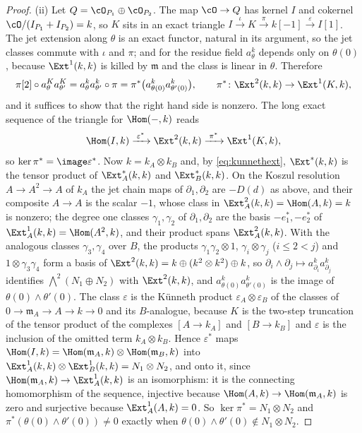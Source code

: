 \begin{proof}
(ii) Let $Q=\cO_{P_{1}}\oplus\cO_{P_{2}}$. The map $\cO\to Q$ has kernel $I$
and cokernel $\cO/(I_{P_{1}}+I_{P_{2}})=k$, so $K$ sits in an exact triangle
$I\xrightarrow{\iota}K\xrightarrow{\pi}k[-1]\xrightarrow{\varepsilon}I[1]$.
The jet extension along $\theta$ is an exact functor, natural in its
argument, so the jet classes commute with $\iota$ and $\pi$; and for the
residue field $a^{k}_{\theta}$ depends only on $\theta(0)$, because
$\Ext^{1}(k,k)$ is killed by $\mathfrak m$ and the class is linear in
$\theta$. Therefore
\[
  \pi[2]\circ a^{K}_{\theta}a^{K}_{\theta'}
  =a^{k}_{\theta}a^{k}_{\theta'}\circ\pi
  =\pi^{*}\bigl(a^{k}_{\theta(0)}a^{k}_{\theta'(0)}\bigr),
  \qquad\pi^{*}\colon\Ext^{2}(k,k)\to\Ext^{1}(K,k),
\]
and it suffices to show that the right hand side is nonzero. The long exact
sequence of the triangle for $\Hom(-,k)$ reads
\[
  \Hom(I,k)\xrightarrow{\;\varepsilon^{*}\;}\Ext^{2}(k,k)\xrightarrow{\;\pi^{*}\;}
  \Ext^{1}(K,k),
\]
so $\ker\pi^{*}=\image\varepsilon^{*}$. Now $k=k_{A}\otimes k_{B}$ and, by
\eqref{eq:kunnethext}, $\Ext^{*}(k,k)$ is the tensor product of
$\Ext^{*}_{A}(k,k)$ and $\Ext^{*}_{B}(k,k)$. On the Koszul resolution
$A\to A^{2}\to A$ of $k_{A}$ the jet chain maps of $\partial_{1},\partial_{2}$
are $-D(d)$ as above, and their composite $A\to A$ is the scalar $-1$, whose
class in $\Ext^{2}_{A}(k,k)=\Hom(A,k)=k$ is nonzero; the degree one classes
$\gamma_{1},\gamma_{2}$ of $\partial_{1},\partial_{2}$ are the basis
$-e_{1}^{*},-e_{2}^{*}$ of $\Ext^{1}_{A}(k,k)=\Hom(A^{2},k)$, and their
product spans $\Ext^{2}_{A}(k,k)$. With the analogous classes
$\gamma_{3},\gamma_{4}$ over $B$, the products $\gamma_{1}\gamma_{2}\otimes1$,
$\gamma_{i}\otimes\gamma_{j}$ ($i\le2<j$) and $1\otimes\gamma_{3}\gamma_{4}$
form a basis of $\Ext^{2}(k,k)=k\oplus(k^{2}\otimes k^{2})\oplus k$, so
$\partial_{i}\wedge\partial_{j}\mapsto a^{k}_{\partial_{i}}a^{k}_{\partial_{j}}$
identifies $\bigwedge^{2}(N_{1}\oplus N_{2})$ with $\Ext^{2}(k,k)$, and
$a^{k}_{\theta(0)}a^{k}_{\theta'(0)}$ is the image of $\theta(0)\wedge\theta'(0)$. The
class $\varepsilon$ is the K\"unneth product $\varepsilon_{A}\otimes\varepsilon_{B}$
of the classes of $0\to\mathfrak m_{A}\to A\to k\to0$ and its $B$-analogue,
because $K$ is the two-step truncation of the tensor product of the complexes
$[A\to k_{A}]$ and $[B\to k_{B}]$ and $\varepsilon$ is the inclusion of the
omitted term $k_{A}\otimes k_{B}$. Hence $\varepsilon^{*}$ maps
$\Hom(I,k)=\Hom(\mathfrak m_{A},k)\otimes\Hom(\mathfrak m_{B},k)$ into
$\Ext^{1}_{A}(k,k)\otimes\Ext^{1}_{B}(k,k)=N_{1}\otimes N_{2}$, and onto it,
since $\Hom(\mathfrak m_{A},k)\to\Ext^{1}_{A}(k,k)$ is an isomorphism: it is
the connecting homomorphism of the sequence, injective because
$\Hom(A,k)\to\Hom(\mathfrak m_{A},k)$ is zero and surjective because
$\Ext^{1}_{A}(A,k)=0$. So $\ker\pi^{*}=N_{1}\otimes N_{2}$
and $\pi^{*}(\theta(0)\wedge\theta'(0))\ne0$ exactly when
$\theta(0)\wedge\theta'(0)\notin N_{1}\otimes N_{2}$.


\end{proof}

